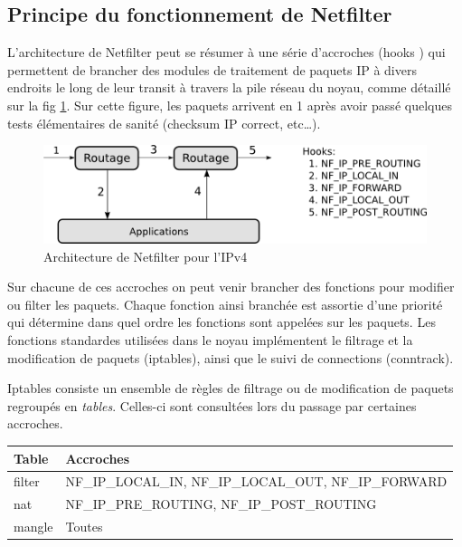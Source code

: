 \subsection{Principe du fonctionnement de Netfilter}


L'architecture de Netfilter peut se résumer à une série d'accroches
(\og hooks \fg{}) qui permettent de brancher des modules de traitement de
paquets IP à divers endroits le long de leur transit à travers la pile
réseau du noyau, comme détaillé sur la fig \ref{NF}. Sur cette figure,
les paquets arrivent en 1 après avoir passé quelques tests
élémentaires de sanité (checksum IP correct, etc\ldots).

\begin{figure}[h]
  \begin{center}
    \includegraphics{netfilter.png}
    \caption{Architecture de Netfilter pour l'IPv4}
    \label{NF}
  \end{center}
\end{figure}

Sur chacune de ces accroches on peut venir brancher des fonctions pour
modifier ou filter les paquets. Chaque fonction ainsi branchée est
assortie d'une priorité qui détermine dans quel ordre les fonctions
sont appelées sur les paquets. Les fonctions standardes utilisées dans
le noyau implémentent le filtrage et la modification de paquets
(iptables), ainsi que le suivi de connections (conntrack).

Iptables consiste un ensemble de règles de filtrage ou de modification
de paquets regroupés en \textit{tables}. Celles-ci sont consultées
lors du passage par certaines accroches.

\begin{center}
  \begin{tabular}{|l|l|}
    \hline
    \textbf{Table} & \textbf{Accroches} \\
    \hline
    filter & NF\_IP\_LOCAL\_IN, NF\_IP\_LOCAL\_OUT, NF\_IP\_FORWARD \\
    \hline
    nat & NF\_IP\_PRE\_ROUTING, NF\_IP\_POST\_ROUTING \\
    \hline
    mangle & Toutes \\
    \hline
  \end{tabular}
\end{center}

